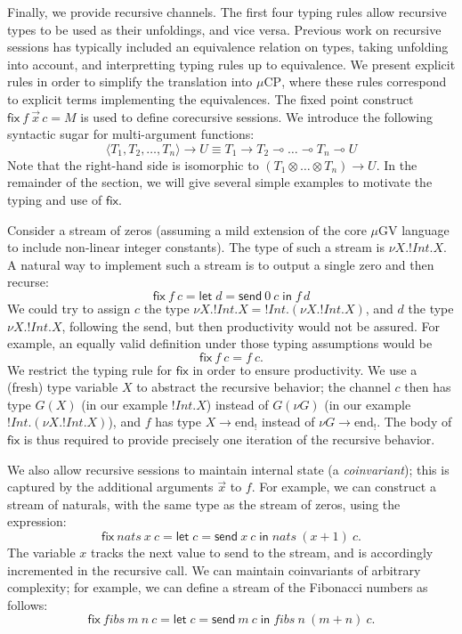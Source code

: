 \documentclass[orivec,envcountsame]{llncs}
\newcommand{\gvout}[2]{{!#1.#2}}
\newcommand{\lto}{\ensuremath{\multimap}}
\newcommand{\uto}{\ensuremath{\rightarrow}}
\newcommand{\outterm}{\mathrm{end}_!}
\newcommand{\mkwd}[1]{\mathsf{#1}}
\newcommand{\gvsend}[2]{\mkwd{send}\:#1\:#2}
\newcommand{\gvlet}[3]{\mkwd{let}\;#1 = #2\;\mkwd{in}\;#3}
\newcommand{\lrkwd}{\mkwd{fix}}
\newcommand{\gvfix}[3]{\lrkwd\:#1\:#2 = #3}
\newcommand{\mucp}{$\mu\mathrm{CP}$\xspace}
\newcommand{\mugv}{$\mu\mathrm{GV}$\xspace}
\newcommand{\todo}[1]{{\noindent\small\color{red} \framebox{\parbox{\dimexpr\linewidth-2\fboxsep-2\fboxrule}{\textbf{TODO:} #1}}}}
\begin{document}
Finally, we provide recursive channels. The first four typing rules allow recursive types to be used
as their unfoldings, and vice versa. Previous work on recursive sessions has typically included an
equivalence relation on types, taking unfolding into account, and interpretting typing rules up to
equivalence. We present explicit rules in order to simplify the translation into \mucp, where these
rules correspond to explicit terms implementing the equivalences.
%
The fixed point construct $\gvfix{f}{\vec{x}\,c}{M}$ is used to define corecursive sessions. We
introduce the following syntactic sugar for multi-argument functions:
\[
  \langle T_1, T_2, \dots, T_n \rangle \uto U \equiv T_1 \uto T_2 \lto \dots \lto T_n \lto U
\]
Note that the right-hand side is isomorphic to $(T_1 \otimes \dots \otimes T_n) \uto U$.  In the
remainder of the section, we will give several simple examples to motivate the typing and use of
$\lrkwd$.

\todo{Define sugar for let}

Consider a stream of zeros (assuming a mild extension of the core \mugv language to include
non-linear integer constants). The type of such a stream is $\nu X.!Int.X$. A natural way to
implement such a stream is to output a single zero and then recurse:
\[
  \lrkwd \: f\:c = \gvlet{d}{\gvsend{0}{c}}{f\,d}
\]
We could try to assign $c$ the type $\nu X.\gvout{Int}{X} = \gvout{Int}{(\nu X.\gvout{Int}{X})}$,
and $d$ the type $\nu X.\gvout{Int}{X}$, following the send, but then productivity would not be
assured. For example, an equally valid definition under those typing assumptions would be
\[ \lrkwd \: f\:c = f\:c.\]
%
We restrict the typing rule for $\lrkwd$ in order to ensure productivity. We use a (fresh) type
variable $X$ to abstract the recursive behavior; the channel $c$ then has type $G(X)$ (in our
example $\gvout{Int}{X}$) instead of $G(\nu G)$ (in our example $\gvout{Int}{(\nu
  X.\gvout{Int}{X})}$), and $f$ has type $X \uto \outterm$ instead of $\nu G \uto \outterm$. The
body of $\lrkwd$ is thus required to provide precisely one iteration of the recursive behavior.

We also allow recursive sessions to maintain internal state (a \emph{coinvariant}); this is captured
by the additional arguments $\vec{x}$ to $f$.  For example, we can construct a stream of naturals,
with the same type as the stream of zeros, using the expression:
\[
  \gvfix{nats}{x\:c}{\gvlet{c}{\gvsend{x}{c}}{nats\:(x + 1)\:c}}.
\]
The variable $x$ tracks the next value to send to the stream, and is accordingly incremented in the
recursive call.  We can maintain coinvariants of arbitrary complexity; for example, we can define a
stream of the Fibonacci numbers as follows:
\[
  \gvfix{fibs}{m\:n\:c}{\gvlet{c}{\gvsend{m}{c}}{fibs\:n\:(m + n)\:c}}.
\]
\end{document}
